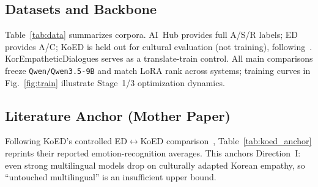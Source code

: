 \documentclass[journal]{IEEEtran}
\begin{document}
\subsection{Datasets and Backbone}
Table~\ref{tab:data} summarizes corpora.
AI~Hub provides full A/S/R labels; ED provides A/C; KoED is held out for cultural evaluation (not training), following~\cite{lee2025koed}.
KorEmpatheticDialogues serves as a translate-train control.
All main comparisons freeze \texttt{Qwen/Qwen3.5-9B} and match LoRA rank across systems; training curves in Fig.~\ref{fig:train} illustrate Stage~1/3 optimization dynamics.

\begin{table}[!t]
\caption{Dataset Statistics}
\label{tab:data}
\centering
{}
\end{table}

\subsection{Literature Anchor (Mother Paper)}
Following KoED's controlled ED$\leftrightarrow$KoED comparison~\cite{lee2025koed}, Table~\ref{tab:koed_anchor} reprints their reported emotion-recognition averages.
This anchors Direction~I: even strong multilingual models drop on culturally adapted Korean empathy, so ``untouched multilingual'' is an insufficient upper bound.
\end{document}

